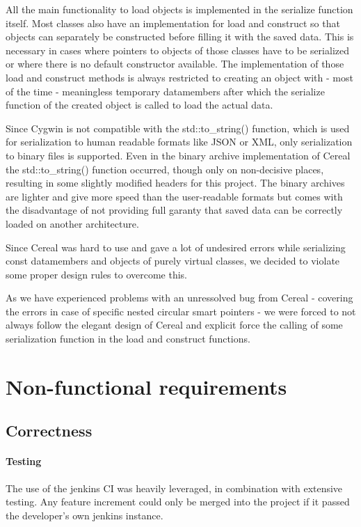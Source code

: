 \documentclass[8pt,a4paper]{report}
\begin{document}
All the main functionality to load objects is implemented in the serialize function itself. Most classes also have an implementation for load and construct so that objects can separately be constructed before filling it with the saved data. This is necessary in cases where pointers to objects of those classes have to be serialized or where there is no default constructor available. The implementation of those load and construct methods is always restricted to creating an object with - most of the time - meaningless temporary datamembers after which the serialize function of the created object is called to load the actual data.

Since Cygwin is not compatible with the std::to\_string() function, which is used for serialization to human readable formats like JSON or XML, only serialization to binary files is supported. Even in the binary archive implementation of Cereal the std::to\_string() function occurred, though only on non-decisive places, resulting in some slightly modified headers for this project.  The binary archives are lighter and give more speed than the user-readable formats but comes with the disadvantage of not providing full garanty that saved data can be correctly loaded on another architecture. 

Since Cereal was hard to use and gave a lot of undesired errors while serializing const datamembers and objects of purely virtual classes, we decided to violate some proper design rules to overcome this.

As we have experienced problems with an unressolved bug from Cereal - covering the errors in case of specific nested circular smart pointers - we were forced to not always follow the elegant design of Cereal and explicit force the calling of some serialization function in the load and construct functions.

\chapter{Non-functional requirements}
\section{Correctness}
\subsubsection{Testing}
The use of the jenkins CI was heavily leveraged, in combination with extensive testing. Any feature increment could only be merged into the project if it passed the developer's own jenkins instance.
\end{document}
